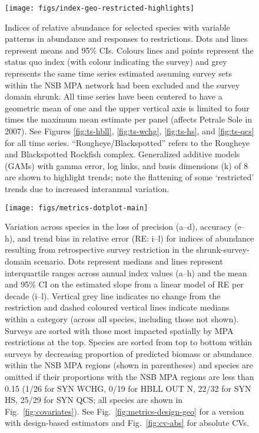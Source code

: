 \documentclass[12pt]{article}
\begin{document}
\begin{figure}[htb]
    \centering
    \texttt{[image: figs/index-geo-restricted-highlights]}
    \caption{Indices of relative abundance for selected species with variable patterns in abundance and responses to restrictions. Dots and lines represent means and 95\% CIs. Colours lines and points represent the status quo index (with colour indicating the survey) and grey represents the same time series estimated assuming survey sets within the NSB MPA network had been excluded and the survey domain shrunk. All time series have been centered to have a geometric mean of one and the upper vertical axis is limited to four times the maximum mean estimate per panel (affects Petrale Sole in 2007). See Figures \ref{fig:ts-hbll}, \ref{fig:ts-wchg}, \ref{fig:ts-hs}, and \ref{fig:ts-qcs} for all time series. ``Rougheye/Blackspotted'' refers to the Rougheye and Blackspotted Rockfish complex. Generalized additive models (GAMs) with gamma error, log links, and basis dimensions (k) of 8 are shown to highlight trends; note the flattening of some `restricted' trends due to increased interannual variation.}
    \label{fig:timeseries}
\end{figure}

\begin{figure}[htb]
    \centering
    \texttt{[image: figs/metrics-dotplot-main]}
    \caption{Variation across species in the loss of precision (a--d), accuracy (e--h), and trend bias in relative error (RE: i--l) for indices of abundance resulting from retrospective survey restriction in the shrunk-survey-domain scenario. Dots represent medians and lines represent interquartile ranges across annual index values (a--h) and the mean and 95\% CI on the estimated slope from a linear model of RE per decade (i--l). Vertical grey line indicates no change from the restriction and dashed coloured vertical lines indicate medians within a category (across all species, including those not shown). Surveys are sorted with those most impacted spatially by MPA restrictions at the top. Species are sorted from top to bottom within surveys by decreasing proportion of predicted biomass or abundance within the NSB MPA regions (shown in parentheses) and species are omitted if their proportions with the NSB MPA regions are less than 0.15 (1/26 for SYN WCHG, 0/19 for HBLL OUT N, 22/32 for SYN HS, 25/29 for SYN QCS; all species are shown in Fig.~\ref{fig:covariates}). See Fig.~\ref{fig:metrics-design-geo} for a version with design-based estimators and Fig.~\ref{fig:cv-abs} for absolute CVs. }
    \label{fig:dotplot}
\end{figure}
\end{document}
